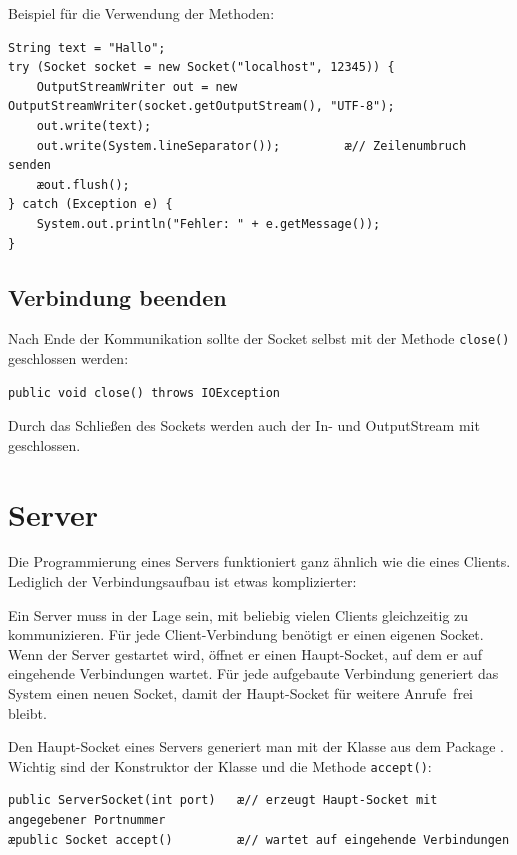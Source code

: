 Beispiel für die Verwendung der Methoden:

\begin{lstlisting}
String text = "Hallo";
try (Socket socket = new Socket("localhost", 12345)) {
    OutputStreamWriter out = new OutputStreamWriter(socket.getOutputStream(), "UTF-8");
    out.write(text);
    out.write(System.lineSeparator());         æ// Zeilenumbruch senden
    æout.flush();
} catch (Exception e) {
    System.out.println("Fehler: " + e.getMessage());
}
\end{lstlisting}

\subsection{Verbindung beenden}

Nach Ende der Kommunikation sollte der Socket selbst mit der Methode
\lstinline|close()| geschlossen werden:

\begin{lstlisting}
public void close() throws IOException
\end{lstlisting}

Durch das Schließen des Sockets werden auch der In- und OutputStream mit
geschlossen.


\section{Server}

Die Programmierung eines Servers funktioniert ganz ähnlich wie die eines
Clients. Lediglich der Verbindungsaufbau ist etwas komplizierter:

Ein Server muss in der Lage sein, mit beliebig vielen Clients gleichzeitig zu
kommunizieren. Für jede Client-Verbindung benötigt er einen eigenen Socket.
Wenn der Server gestartet wird, öffnet er einen Haupt-Socket, auf dem er auf
eingehende Verbindungen wartet. Für jede aufgebaute Verbindung generiert das
System einen neuen Socket, damit der Haupt-Socket für weitere \glqq Anrufe\grqq\
frei bleibt.

Den Haupt-Socket eines Servers generiert man mit der Klasse
 aus dem Package . Wichtig sind der
Konstruktor der Klasse und die Methode \lstinline|accept()|:

\begin{lstlisting}
public ServerSocket(int port)   æ// erzeugt Haupt-Socket mit angegebener Portnummer 
æpublic Socket accept()	        æ// wartet auf eingehende Verbindungen
\end{lstlisting}

